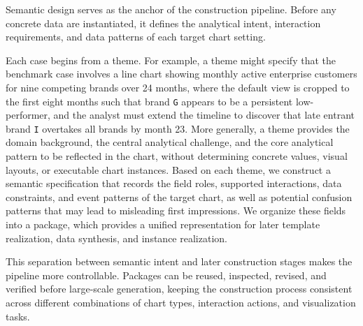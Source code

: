 \documentclass[review,journal,hideappendix]{vgtc} %
\begin{document}
Semantic design serves as the anchor of the construction pipeline. Before any concrete data are instantiated, it defines the analytical intent, interaction requirements, and data patterns of each target chart setting.

Each case begins from a theme. For example, a theme might specify that the benchmark case involves a line chart showing monthly active enterprise customers for nine competing brands over 24 months, where the default view is cropped to the first eight months such that brand \texttt{G} appears to be a persistent low-performer, and the analyst must extend the timeline to discover that late entrant brand \texttt{I} overtakes all brands by month 23. More generally, a theme provides the domain background, the central analytical challenge, and the core analytical pattern to be reflected in the chart, without determining concrete values, visual layouts, or executable chart instances. Based on each theme, we construct a semantic specification that records the field roles, supported interactions, data constraints, and event patterns of the target chart, as well as potential confusion patterns that may lead to misleading first impressions. We organize these fields into a package, which provides a unified representation for later template realization, data synthesis, and instance realization.

This separation between semantic intent and later construction stages makes the pipeline more controllable. Packages can be reused, inspected, revised, and verified before large-scale generation, keeping the construction process consistent across different combinations of chart types, interaction actions, and visualization tasks.
\end{document}
